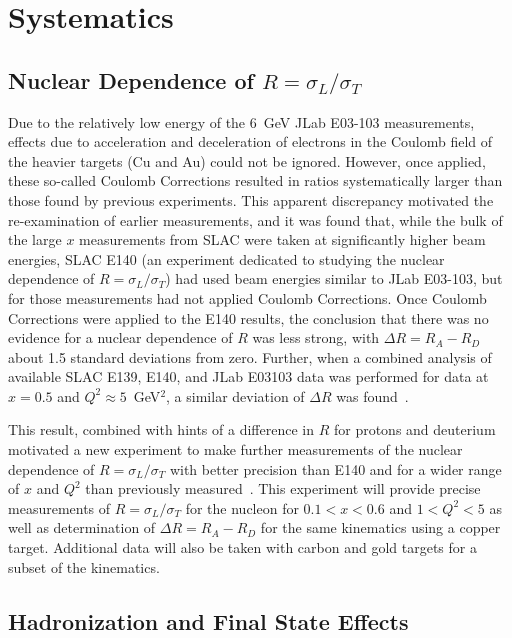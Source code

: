 \section{Systematics}
\subsection{Nuclear Dependence of $R=\sigma_L/\sigma_T$}


Due to the relatively low energy of the 6~GeV JLab E03-103 measurements, effects due to acceleration and
deceleration of electrons in the Coulomb field of the heavier targets (Cu and Au) could not be ignored.
However, once applied, these so-called Coulomb Corrections resulted in ratios systematically larger
than those found by previous experiments.  This apparent discrepancy motivated the re-examination of
earlier measurements, and it was found that, while the bulk of the large $x$ measurements from SLAC
were taken at significantly higher beam energies, SLAC E140 (an experiment dedicated to studying
the nuclear dependence of $R=\sigma_L/\sigma_T$) had used beam energies similar to JLab E03-103, but for
those measurements had not applied Coulomb Corrections.  Once Coulomb Corrections were applied to the E140
results, the conclusion that there was no evidence for a nuclear dependence of $R$ was less strong, with
$\Delta R=R_A-R_D$ about 1.5 standard deviations from zero. Further, when a combined analysis
of available SLAC E139, E140, and JLab E03103 data was performed for data at $x=0.5$ and $Q^2\approx5$~GeV$^2$,
a similar deviation of $\Delta R$ was found~\cite{Solvignon:2009it}.

This result, combined with hints of a difference in $R$ for protons and deuterium motivated a 
new experiment to make further measurements of the nuclear dependence of $R=\sigma_L/\sigma_T$
with better precision than E140 and for a wider range of $x$ and $Q^2$ than previously
measured~\cite{12gev_nucr}.  This experiment will provide precise measurements of $R=\sigma_L/\sigma_T$
for the nucleon for $0.1<x<0.6$ and $1<Q^2<5$ as well as determination of $\Delta R= R_A-R_D$ for the same
kinematics using a copper target. Additional data will also be taken with carbon and gold targets for a subset
of the kinematics.


\subsection{Hadronization and Final State Effects}

